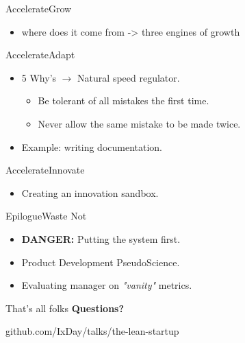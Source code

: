 \documentclass[aspectratio=169]{beamer}
\begin{document}
\begin{frame}{Accelerate}{Grow}
  \begin{itemize}
    \item where does it come from -> three engines of growth
  \end{itemize}
\end{frame}

\begin{frame}{Accelerate}{Adapt}
  \begin{itemize}
    \item 5 Why's $\rightarrow$ Natural speed regulator.
      \begin{itemize}
        \item Be tolerant of all mistakes the first time.
        \item Never allow the same mistake to be made twice.
  \end{itemize}
    \item Example: writing documentation.
  \end{itemize}
\end{frame}


\begin{frame}{Accelerate}{Innovate}
  \begin{itemize}
    \item Creating an innovation sandbox.
  \end{itemize}
\end{frame}

\begin{frame}{Epilogue}{Waste Not}
  \begin{itemize}
    \item \textbf{DANGER:} Putting the system first.
    \item Product Development PseudoScience.
    \item Evaluating manager on \textit{"vanity"} metrics.
  \end{itemize}
\end{frame}

\begin{frame}{That's all folks}
  \LARGE \textbf{Questions?}

  \begin{flushright}
    \normalsize github.com/\color{Green}IxDay\color{Grey}/talks/the-lean-startup
   \end{flushright}
\end{frame}
\end{document}
